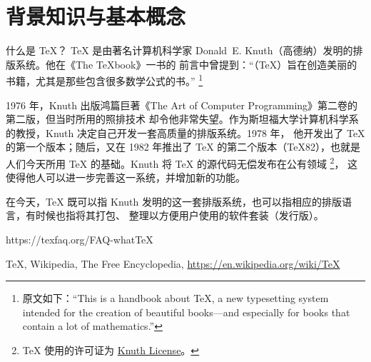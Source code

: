 \section{背景知识与基本概念}

\begin{faq}{什么是 \TeX{}？}
  \TeX{} 是由著名计算机科学家 Donald~E. Knuth（高德纳）发明的排版系统。他在《The \TeX book》一书的
  前言中曾提到：“（\TeX{}）旨在创造美丽的书籍，尤其是那些包含很多数学公式的书。”
  \footnote{原文如下：“This is a handbook about \TeX{}, a new typesetting system intended for the
  creation of beautiful books---and especially for books that contain a lot of mathematics.”}
  
  1976 年，Knuth 出版鸿篇巨著《The Art of Computer Programming》第二卷的第二版，但当时所用的照排技术
  却令他非常失望。作为斯坦福大学计算机科学系的教授，Knuth 决定自己开发一套高质量的排版系统。1978 年，
  他开发出了 \TeX{} 的第一个版本；随后，又在 1982 年推出了 \TeX{} 的第二个版本（\TeX 82），也就是
  人们今天所用 \TeX{} 的基础。Knuth 将 \TeX{} 的源代码无偿发布在公有领域
  \footnote{\TeX{} 使用的许可证为 \href{https://www.ctan.org/license/knuth}{Knuth License}。}，
  这使得他人可以进一步完善这一系统，并增加新的功能。
  
  在今天，\TeX{} 既可以指 Knuth 发明的这一套排版系统，也可以指相应的排版语言，有时候也指将其打包、
  整理以方便用户使用的软件套装（发行版）。
  
  \begin{reference}
    \item https://texfaq.org/FAQ-whatTeX
    \item \TeX{}, Wikipedia, The Free Encyclopedia, \url{https://en.wikipedia.org/wiki/TeX}
  \end{reference}
  
  
\end{faq}

